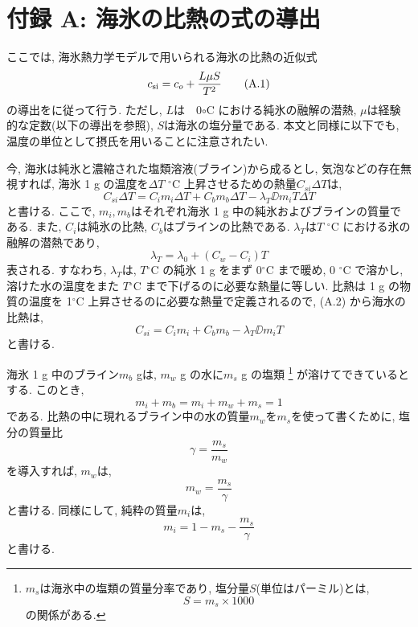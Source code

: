\chapter*{付録 A: 海氷の比熱の式の導出}
ここでは, 海氷熱力学モデルで用いられる海氷の比熱の近似式
\begin{equation*}
 c_{\rm si} = c_o + \dfrac{L \mu S}{T^2}
  \tag{A.1}
\end{equation*}
の導出を\citep{ono1967specific}に従って行う.
ただし, $L$は　0$\circ$C における純氷の融解の潜熱,
$\mu$は経験的な定数(以下の導出を参照), $S$は海氷の塩分量である. 
本文と同様に以下でも, 温度の単位として摂氏を用いることに注意されたい. 

今, 海氷は純氷と濃縮された塩類溶液(ブライン)から成るとし, 気泡などの存在無視すれば, 
海氷 1 g の温度を$\Delta T$ $^\circ$C 上昇させるための熱量$C_{si}\Delta T$は,
\begin{equation*}
 C_{si} \Delta T = C_i m_i \Delta T + C_b m_b \Delta T - \lambda_T \DD{m_i}{T} \Delta T
 \tag{A.2}
\end{equation*}
と書ける.
ここで, $m_i, m_b$はそれぞれ海氷 1 g 中の純氷およびブラインの質量である.
また, $C_i$は純氷の比熱, $C_b$はブラインの比熱である.
$\lambda_T$は$T$ $^\circ$C における氷の融解の潜熱であり,
\begin{equation*}
 \lambda_T = \lambda_0 + (C_w - C_i)T
 \tag{A.3}
\end{equation*}
表される.
すなわち, $\lambda_T$は, $T$$^\circ$C の純氷 1 g をまず 0$^\circ$C まで暖め,
0 $^\circ$C で溶かし, 溶けた水の温度をまた $T$$^\circ$C まで下げるのに必要な熱量に等しい.
比熱は 1 g の物質の温度を 1$^\circ$C 上昇させるのに必要な熱量で定義されるので,
(A.2) から海水の比熱は,
\begin{equation*}
 C_{si} = C_i m_i + C_b m_b - \lambda_T \DD{m_i}{T}
 \tag{A.4}
\end{equation*}
と書ける.

海氷 1 g 中のブライン$m_b$ gは, $m_w$ g の水に$m_s$ g の塩類%
\footnote{
$m_s$は海氷中の塩類の質量分率であり, 塩分量$S$(単位はパーミル)とは,
$$
 S = m_s \times 1000 
$$
の関係がある.  
}
が溶けてできているとする.
このとき,
%
\begin{equation*}
 m_i + m_b = m_i + m_w + m_s = 1
 \tag{A.5}
\end{equation*}
である.
比熱の中に現れるブライン中の水の質量$m_w$を$m_s$を使って書くために,
塩分の質量比
\begin{equation*}
 \gamma = \dfrac{m_s}{m_w}
 \tag{A.6}
\end{equation*}
を導入すれば, $m_w$は,
\begin{equation*}
 m_w = \dfrac{m_s}{\gamma}
 \tag{A.7}  
\end{equation*}
と書ける.
同様にして, 純粋の質量$m_i$は,
\begin{equation*}
 m_i = 1 - m_s - \dfrac{m_s}{\gamma}
 \tag{A.8}  
\end{equation*}
と書ける.

